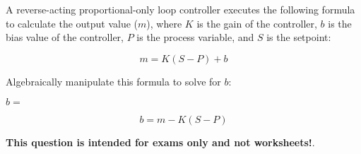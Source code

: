 

A reverse-acting proportional-only loop controller executes the following formula to calculate the output value ($m$), where $K$ is the gain of the controller, $b$ is the bias value of the controller, $P$ is the process variable, and $S$ is the setpoint:

$$m = K(S - P) + b$$

Algebraically manipulate this formula to solve for $b$:

\vskip 20pt

$b = $







$$b = m - K(S - P)$$







{\bf This question is intended for exams only and not worksheets!}.



